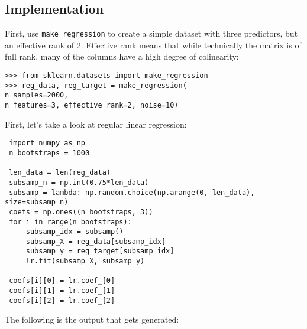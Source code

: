 \documentclass[SKL-MASTER.tex]{subfiles}
\begin{document}
\subsection*{Implementation} %
First, use \texttt{make\_regression} to create a simple dataset with three predictors, but an
effective rank of 2. Effective rank means that while technically the matrix is of full rank,
many of the columns have a high degree of colinearity:
\begin{framed}
\begin{verbatim}
>>> from sklearn.datasets import make_regression
>>> reg_data, reg_target = make_regression(
n_samples=2000,
n_features=3, effective_rank=2, noise=10)
\end{verbatim}
\end{framed}
\newpage

First, let's take a look at regular linear regression:

	\begin{verbatim}
 import numpy as np
 n_bootstraps = 1000
 
 len_data = len(reg_data)
 subsamp_n = np.int(0.75*len_data)
 subsamp = lambda: np.random.choice(np.arange(0, len_data), size=subsamp_n)
 coefs = np.ones((n_bootstraps, 3))
 for i in range(n_bootstraps):
     subsamp_idx = subsamp()
     subsamp_X = reg_data[subsamp_idx]
     subsamp_y = reg_target[subsamp_idx]
     lr.fit(subsamp_X, subsamp_y)
     
 coefs[i][0] = lr.coef_[0]
 coefs[i][1] = lr.coef_[1]
 coefs[i][2] = lr.coef_[2]
\end{verbatim}



The following is the output that gets generated:
\end{document}
